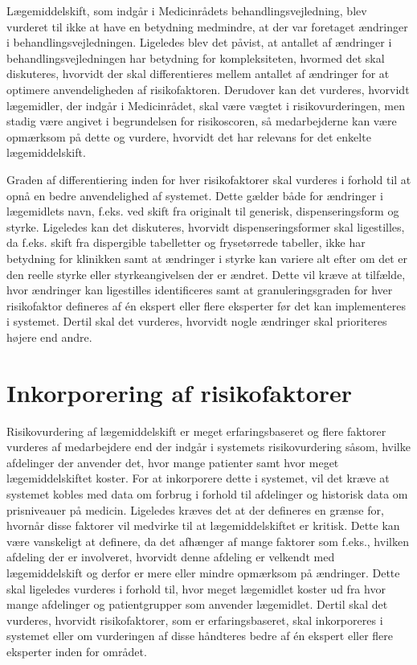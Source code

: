 Lægemiddelskift, som indgår i Medicinrådets behandlingsvejledning, blev vurderet til ikke at have en betydning medmindre, at der var foretaget ændringer i behandlingsvejledningen. Ligeledes blev det påvist, at antallet af ændringer i behandlingsvejledningen har betydning for kompleksiteten, hvormed det skal diskuteres, hvorvidt der skal differentieres mellem antallet af ændringer for at optimere anvendeligheden af risikofaktoren. Derudover kan det vurderes, hvorvidt lægemidler, der indgår i Medicinrådet, skal være vægtet i risikovurderingen, men stadig være angivet i begrundelsen for risikoscoren, så medarbejderne kan være opmærksom på dette og vurdere, hvorvidt det har relevans for det enkelte lægemiddelskift.

Graden af differentiering inden for hver risikofaktorer skal vurderes i forhold til at opnå en bedre anvendelighed af systemet. Dette gælder både for ændringer i lægemidlets navn, f.eks. ved skift fra originalt til generisk, dispenseringsform og styrke. Ligeledes kan det diskuteres, hvorvidt dispenseringsformer skal ligestilles, da f.eks. skift fra dispergible tabelletter og frysetørrede tabeller, ikke har betydning for klinikken samt at ændringer i styrke kan variere alt efter om det er den reelle styrke eller styrkeangivelsen der er ændret. Dette vil kræve at tilfælde, hvor ændringer kan ligestilles identificeres samt at granuleringsgraden for hver risikofaktor defineres af én ekspert eller flere eksperter før det kan implementeres i systemet. Dertil skal det vurderes, hvorvidt nogle ændringer skal prioriteres højere end andre. 

\section{Inkorporering af risikofaktorer}
Risikovurdering af lægemiddelskift er meget erfaringsbaseret og flere faktorer vurderes af medarbejdere end der indgår i systemets risikovurdering såsom, hvilke afdelinger der anvender det, hvor mange patienter samt hvor meget lægemiddelskiftet koster. For at inkorporere dette i systemet, vil det kræve at systemet kobles med data om forbrug i forhold til afdelinger og historisk data om prisniveauer på medicin. Ligeledes kræves det at der defineres en grænse for, hvornår disse faktorer vil medvirke til at lægemiddelskiftet er kritisk. Dette kan være vanskeligt at definere, da det afhænger af mange faktorer som f.eks., hvilken afdeling der er involveret, hvorvidt denne afdeling er velkendt med lægemiddelskift og derfor er mere eller mindre opmærksom på ændringer. Dette skal ligeledes vurderes i forhold til, hvor meget lægemidlet koster ud fra hvor mange afdelinger og patientgrupper som anvender lægemidlet. Dertil skal det vurderes, hvorvidt risikofaktorer, som er erfaringsbaseret, skal inkorporeres i systemet eller om vurderingen af disse håndteres bedre af én ekspert eller flere eksperter inden for området.

